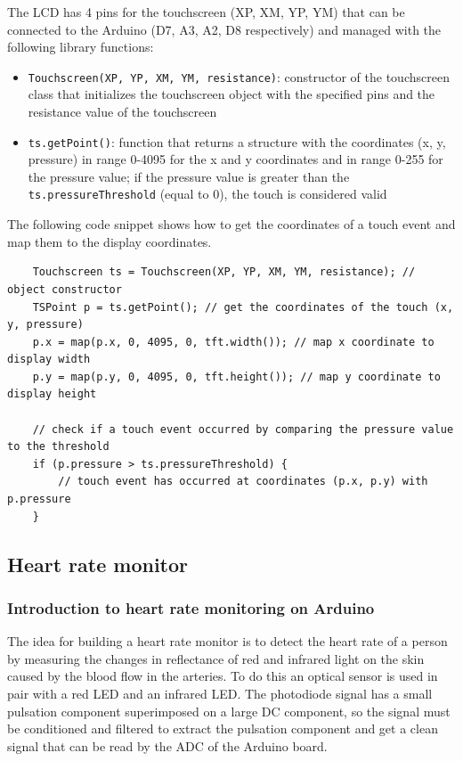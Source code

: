 The LCD has 4 pins for the touchscreen (XP, XM, YP, YM) that can be connected to the Arduino (D7, A3, A2, D8 respectively)
and managed with the following library functions:
\begin{itemize}
	\item \texttt{Touchscreen(XP, YP, XM, YM, resistance)}: constructor of the touchscreen class that initializes the touchscreen
	object with the specified pins and the resistance value of the touchscreen
	\item \texttt{ts.getPoint()}: function that returns a structure with the coordinates (x, y, pressure) in range 0-4095
	for the x and y coordinates and in range 0-255 for the pressure value; if the pressure value is greater than the
	\texttt{ts.pressureThreshold} (equal to 0), the touch is considered valid
\end{itemize}

The following code snippet shows how to get the coordinates of a touch event and map them to the display coordinates.
\begin{lstlisting}
	Touchscreen ts = Touchscreen(XP, YP, XM, YM, resistance); // object constructor
	TSPoint p = ts.getPoint(); // get the coordinates of the touch (x, y, pressure)
	p.x = map(p.x, 0, 4095, 0, tft.width()); // map x coordinate to display width
	p.y = map(p.y, 0, 4095, 0, tft.height()); // map y coordinate to display height

	// check if a touch event occurred by comparing the pressure value to the threshold
	if (p.pressure > ts.pressureThreshold) {
		// touch event has occurred at coordinates (p.x, p.y) with p.pressure
	}
\end{lstlisting}

\newpage

\subsection{Heart rate monitor}
\subsubsection*{Introduction to heart rate monitoring on Arduino}
The idea for building a heart rate monitor is to detect the heart rate of a person by measuring the changes in reflectance of red and
infrared light on the skin caused by the blood flow in the arteries. To do this an optical sensor is used in pair with a red LED and
an infrared LED. The photodiode signal has a small pulsation component superimposed on a large DC component, so the signal must be
conditioned and filtered to extract the pulsation component and get a clean signal that can be read by the ADC of the Arduino board. 

